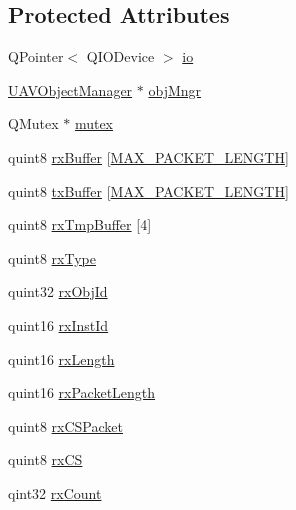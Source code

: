 \subsection*{\-Protected \-Attributes}
\begin{DoxyCompactItemize}
\item 
\-Q\-Pointer$<$ \-Q\-I\-O\-Device $>$ \hyperlink{group___u_a_v_talk_plugin_ga0047f38af98ba4de8e38500e10b73046}{io}
\item 
\hyperlink{class_u_a_v_object_manager}{\-U\-A\-V\-Object\-Manager} $\ast$ \hyperlink{group___u_a_v_talk_plugin_ga096422f1ff46ea45de07a92c41827aa5}{obj\-Mngr}
\item 
\-Q\-Mutex $\ast$ \hyperlink{group___u_a_v_talk_plugin_ga2dea39cdabf26ef85d0b26583e21e60b}{mutex}
\item 
quint8 \hyperlink{group___u_a_v_talk_plugin_ga612e1b395a61ee81d90d8199ba789a86}{rx\-Buffer} \mbox{[}\hyperlink{group___u_a_v_talk_plugin_gab5a37286c5e8b676d49e134f26444a0c}{\-M\-A\-X\-\_\-\-P\-A\-C\-K\-E\-T\-\_\-\-L\-E\-N\-G\-T\-H}\mbox{]}
\item 
quint8 \hyperlink{group___u_a_v_talk_plugin_ga7f0eb8c42215b435a77b84d7ffdbbfc3}{tx\-Buffer} \mbox{[}\hyperlink{group___u_a_v_talk_plugin_gab5a37286c5e8b676d49e134f26444a0c}{\-M\-A\-X\-\_\-\-P\-A\-C\-K\-E\-T\-\_\-\-L\-E\-N\-G\-T\-H}\mbox{]}
\item 
quint8 \hyperlink{group___u_a_v_talk_plugin_ga94d59693bfbe92bf000ee85b559693e0}{rx\-Tmp\-Buffer} \mbox{[}4\mbox{]}
\item 
quint8 \hyperlink{group___u_a_v_talk_plugin_ga59962a309157ed27efad61d5bf85f650}{rx\-Type}
\item 
quint32 \hyperlink{group___u_a_v_talk_plugin_ga922e3ea36927c84023cfb0cf719c9aa0}{rx\-Obj\-Id}
\item 
quint16 \hyperlink{group___u_a_v_talk_plugin_ga72761110b9b683dad5615619c9323674}{rx\-Inst\-Id}
\item 
quint16 \hyperlink{group___u_a_v_talk_plugin_ga52cc4d0f063a520fcf7fc2a10254118b}{rx\-Length}
\item 
quint16 \hyperlink{group___u_a_v_talk_plugin_ga8ce408e2fe258de7a15c77540055a81d}{rx\-Packet\-Length}
\item 
quint8 \hyperlink{group___u_a_v_talk_plugin_gab6dc6fd77ce7d02c121d7c197dfdebd2}{rx\-C\-S\-Packet}
\item 
quint8 \hyperlink{group___u_a_v_talk_plugin_gabfde70d24df43bcff2ab3c3da3f2444f}{rx\-C\-S}
\item 
qint32 \hyperlink{group___u_a_v_talk_plugin_ga380dea6ca845f80612070ed17ea65655}{rx\-Count}

\end{DoxyCompactItemize}
